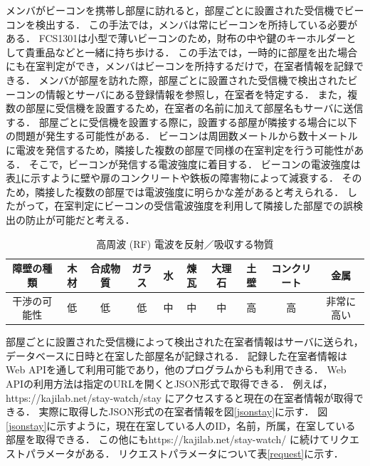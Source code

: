 メンバがビーコンを携帯し部屋に訪れると，部屋ごとに設置された受信機でビーコンを検出する．
この手法では，メンバは常にビーコンを所持している必要がある．
FCS1301は小型で薄いビーコンのため，財布の中や鍵のキーホルダーとして貴重品などと一緒に持ち歩ける．
この手法では，一時的に部屋を出た場合にも在室判定ができ，メンバはビーコンを所持するだけで，在室者情報を記録できる．
メンバが部屋を訪れた際，部屋ごとに設置された受信機で検出されたビーコンの情報とサーバにある登録情報を参照し，在室者を特定する．
また，複数の部屋に受信機を設置するため，在室者の名前に加えて部屋名もサーバに送信する．
部屋ごとに受信機を設置する際に，設置する部屋が隣接する場合に以下の問題が発生する可能性がある．
ビーコンは周囲数メートルから数十メートルに電波を発信するため，隣接した複数の部屋で同様の在室判定を行う可能性がある．
そこで，ビーコンが発信する電波強度に着目する．
ビーコンの電波強度は表\ref{tb:rf}に示すように壁や扉のコンクリートや鉄板の障害物によって減衰する\cite{barrier}．
そのため，隣接した複数の部屋では電波強度に明らかな差があると考えられる．
したがって，在室判定にビーコンの受信電波強度を利用して隣接した部屋での誤検出の防止が可能だと考える．

\begin{table}[H]
  \begin{center}
    \caption{高周波 (RF) 電波を反射／吸収する物質}
    \label{tb:rf}
    \begin{tabular}{|c||c|c|c|c|c|c|c|c|c|} \hline
      障壁の種類  & 木材 & 合成物質 & ガラス & 水 & 煉瓦 & 大理石 & 土壁 & コンクリート & 金属    \\ \hline
      干渉の可能性 & 低  & 低    & 低   & 中 & 中  & 中   & 高  & 高      & 非常に高い \\ \hline
    \end{tabular}
  \end{center}
\end{table}

部屋ごとに設置された受信機によって検出された在室者情報はサーバに送られ，データベースに日時と在室した部屋名が記録される．
記録した在室者情報はWeb APIを通して利用可能であり，他のプログラムからも利用できる．
Web APIの利用方法は指定のURLを開くとJSON形式\cite{json}で取得できる．
例えば，https://kajilab.net/stay-watch/stay にアクセスすると現在の在室者情報が取得できる．
実際に取得したJSON形式の在室者情報を図\ref{jsonstay}に示す．
図\ref{jsonstay}に示すように，現在在室している人のID，名前，所属，在室している部屋を取得できる．
この他にもhttps://kajilab.net/stay-watch/ に続けてリクエストパラメータがある．
リクエストパラメータについて表\ref{request}に示す．

